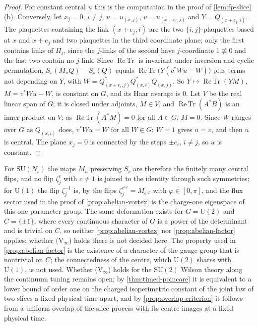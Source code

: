 \documentclass[11pt,a4paper]{amsart}
\theoremstyle{definition}
\theoremstyle{remark}
\numberwithin{equation}{section}
\DeclareMathOperator{\ReTr}{Re\,Tr}  %
\newcommand{\SU}{\mathrm{SU}}              %
\newcommand{\U}{\mathrm{U}}                %
\begin{document}
\begin{proof}
For constant central $u$ this is the computation in the proof of \cref{lem:fp-slice}(b). Conversely, let $x_j=0$, $i\ne j$, $u=u_{(x,j)}$, $v=u_{(x+e_i,j)}$ and $Y=Q_{(x+e_j,i)}$. The plaquettes containing the link $(x+e_j,i)$ are the two $\{i,j\}$-plaquettes based at $x$ and $x+e_j$ and two plaquettes in the third coordinate plane; only the first contains links of $\Pi_j$, since the $j$-links of the second have $j$-coordinate $1\not\equiv0$ and the last two contain no $j$-link. Since $\ReTr$ is invariant under inversion and cyclic permutation, $S_s(M_uQ)-S_s(Q)$ equals $\ReTr\bigl(Y(v^*Wu-W)\bigr)$ plus terms not depending on $Y$, with $W=Q^*_{(x+e_i,j)}Q^*_{(x,i)}Q_{(x,j)}$. So $Y\mapsto\ReTr(YM)$, $M=v^*Wu-W$, is constant on $G$, and its Haar average is $0$. Let $V$ be the real linear span of $G$; it is closed under adjoints, $M\in V$, and $\ReTr(A^*B)$ is an inner product on $V$; as $\ReTr(A^*M)=0$ for all $A\in G$, $M=0$. Since $W$ ranges over $G$ as $Q_{(x,i)}$ does, $v^*Wu=W$ for all $W\in G$: $W=1$ gives $u=v$, and then $u$ is central. The plane $x_j=0$ is connected by the steps $\pm e_i$, $i\ne j$, so $u$ is constant.
\end{proof}

For $\SU(N_c)$ the maps $M_u$ preserving $S_s$ are therefore the finitely many central flips, and no flip $\zeta^c_j$ with $c\ne1$ is joined to the identity through such symmetries; for $\U(1)$ the flip $\zeta_j^{-1}$ is, by the flips $\zeta_j^{e^{i\varphi}}=M_{e^{i\varphi}}$ with $\varphi\in[0,\pi]$, and the flux sector used in the proof of \cref{prop:abelian-vortex} is the charge-one eigenspace of this one-parameter group. The same deformation exists for $G=\U(2)$ and $C=\{\pm1\}$, where every continuous character of $G$ is a power of the determinant and is trivial on $C$, so neither \cref{prop:abelian-vortex} nor \cref{prop:abelian-factor} applies; whether \textup{(V$_\infty$)} holds there is not decided here. The property used in \cref{prop:abelian-factor} is the existence of a character of the gauge group that is nontrivial on $C$; the connectedness of the centre, which $\U(2)$ shares with $\U(1)$, is not used. Whether \textup{(V$_\infty$)} holds for the $\SU(2)$ Wilson theory along the continuum tuning remains open; by \cref{thm:timed-poincare} it is equivalent to a lower bound of order one on the charged isoperimetric constant of the joint law of two slices a fixed physical time apart, and by \cref{prop:overlap-criterion} it follows from a uniform overlap of the slice process with its centre images at a fixed physical time.
\end{document}
